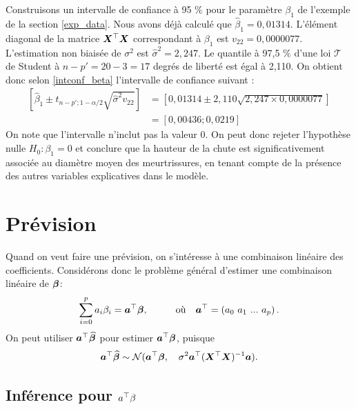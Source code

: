 \begin{exemple}
Construisons un intervalle de confiance à 95 $\%$ pour le paramètre $\beta_1$ de l'exemple de la section \ref{exp_data}. Nous avons déjà calculé que $\widehat\beta_1=0,01314$. L'élément diagonal de la matrice $\bm{X}^\top\bm{X}$ correspondant à $\beta_1$ est $v_{22}=0,0000077$. L'estimation non biaisée de $\sigma^2$ est $\widehat\sigma^2=2,247$. Le quantile à 97,5 $\%$ d'une loi $\mathcal{T}$ de Student à $n-p'=20-3=17$ degrés de liberté est égal à 2,110.  On obtient donc selon \eqref{intconf_beta} l'intervalle de confiance suivant :
\begin{align*}
\left[ \widehat\beta_1\pm t_{n-p'; 1-\alpha/2}\sqrt{\widehat\sigma^2 v_{22}} \right] &=\left[0,01314\pm2,110\sqrt{2,247\times 0,0000077}\right]\\
&=[0,00436;0,0219]
\end{align*}
On note que l'intervalle n'inclut pas la valeur 0. On peut donc rejeter l'hypothèse nulle $H_0: \beta_1=0$  et conclure que la hauteur de la chute est significativement associée au diamètre moyen des meurtrissures, en tenant compte de la présence des autres variables explicatives dans le modèle.
\end{exemple}


\section{Prévision}
\label{sec:PrévisionRLM}


Quand on veut faire une prévision, on s'intéresse à une combinaison linéaire des coefficients. Considérons donc le problème général d'estimer une combinaison linéaire de $\bm\beta$:
\begin{equation}
\sum_{i=0}^p a_i \beta_i = \bo a^\top\bobeta,
	\hspace{1cm} \mbox{o\`u} \quad \bo a^\top=\left(a_0\ a_1 \ ... \ a_p\right).
\label{eq:abeta}
\end{equation}
On peut utiliser $\bm{a}^\top\widehat{\bm\beta}$ pour estimer $\bm{a}^\top\bm\beta$, puisque
\begin{equation}
\bm{a}^\top\widehat{\bm\beta} \sim \mathcal{N}(\bm{a}^\top\bm\beta, \quad \sigma^2\bm{a}^\top(\bm{X}^\top\bm{X})^{-1}\bm{a}).
\label{eq:distabeta}
\end{equation}


\subsection{Inférence pour  $a^\top\beta$ }
\label{sec:TestsDHypothèsetheta}


